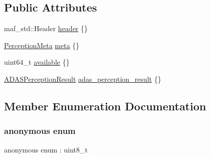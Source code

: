 \subsection*{Public Attributes}
\begin{DoxyCompactItemize}
\item 
maf\+\_\+std\+::\+Header \hyperlink{structmaf__perception__interface_1_1ADASPerception_a614936a95cb89e3d374ad88903ad1d44}{header} \{\}
\item 
\hyperlink{structmaf__perception__interface_1_1PerceptionMeta}{Perception\+Meta} \hyperlink{structmaf__perception__interface_1_1ADASPerception_a44b2cd14ef462d1fd403f678fe7f803e}{meta} \{\}
\item 
uint64\+\_\+t \hyperlink{structmaf__perception__interface_1_1ADASPerception_a7bdc644812230e8715b099b60a9a785b}{available} \{\}
\item 
\hyperlink{structmaf__perception__interface_1_1ADASPerceptionResult}{A\+D\+A\+S\+Perception\+Result} \hyperlink{structmaf__perception__interface_1_1ADASPerception_a2ccba6784879f8463d66ebaf69f1438d}{adas\+\_\+perception\+\_\+result} \{\}
\end{DoxyCompactItemize}


\subsection{Member Enumeration Documentation}
\mbox{\label{structmaf__perception__interface_1_1ADASPerception_a07a7cdb2910a66db83f342c5964657a3}} 
\subsubsection{\texorpdfstring{anonymous enum}{anonymous enum}}
{\footnotesize\ttfamily anonymous enum \+: uint8\+\_\+t}

